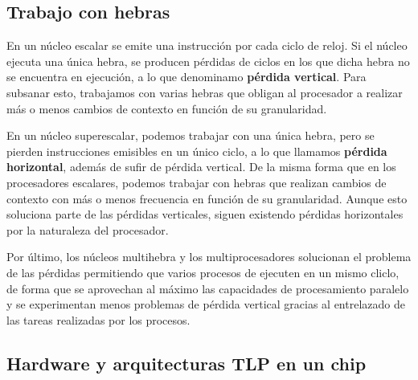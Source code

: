\subsection{Trabajo con hebras}

En un núcleo escalar se emite una instrucción por cada ciclo de reloj.
Si el núcleo ejecuta una única hebra, se producen pérdidas de ciclos en los que dicha hebra no se encuentra en ejecución, a lo que denominamo \textbf{pérdida vertical}.
Para subsanar esto, trabajamos con varias hebras que obligan al procesador a realizar más o menos cambios de contexto en función de su granularidad.

En un núcleo superescalar, podemos trabajar con una única hebra, pero se pierden instrucciones emisibles en un único ciclo, a lo que llamamos \textbf{pérdida horizontal}, además de sufir de pérdida vertical.
De la misma forma que en los procesadores escalares, podemos trabajar con hebras que realizan cambios de contexto con más o menos frecuencia en función de su granularidad.
Aunque esto soluciona parte de las pérdidas verticales, siguen existendo pérdidas horizontales por la naturaleza del procesador.

Por último, los núcleos multihebra y los multiprocesadores solucionan el problema de las pérdidas permitiendo que varios procesos de ejecuten en un mismo cliclo, de forma que se aprovechan al máximo las capacidades de procesamiento paralelo y se experimentan menos problemas de pérdida vertical gracias al entrelazado de las tareas realizadas por los procesos.

\subsection{Hardware y arquitecturas TLP en un chip}

